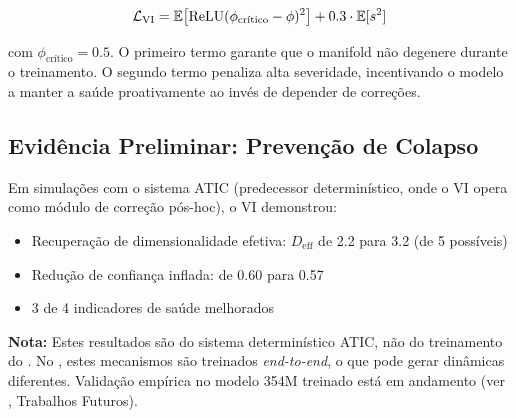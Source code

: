 \begin{equation}
    \mathcal{L}_{\text{VI}} = \mathbb{E}\big[\text{ReLU}(\phi_{\text{cr\'itico}} - \phi)^2\big]
    + 0.3 \cdot \mathbb{E}[s^2]
\end{equation}

com $\phi_{\text{cr\'itico}} = 0.5$. O primeiro termo garante que o manifold
n\~ao degenere durante o treinamento. O segundo termo penaliza alta
severidade, incentivando o modelo a manter a sa\'ude proativamente ao
inv\'es de depender de corre\c{c}\~oes.

\subsection{Evid\^encia Preliminar: Preven\c{c}\~ao de Colapso}

Em simula\c{c}\~oes com o sistema ATIC (predecessor determin\'istico, onde
o VI opera como m\'odulo de corre\c{c}\~ao p\'os-hoc), o VI demonstrou:

\begin{itemize}
    \item Recupera\c{c}\~ao de dimensionalidade efetiva: $D_{\text{eff}}$
    de 2.2 para 3.2 (de 5 poss\'iveis)
    \item Redu\c{c}\~ao de confian\c{c}a inflada: de 0.60 para 0.57
    \item 3 de 4 indicadores de sa\'ude melhorados
\end{itemize}

\textbf{Nota:} Estes resultados s\~ao do sistema determin\'istico ATIC,
n\~ao do treinamento do \aletheion{}. No \aletheion{}, estes mecanismos
s\~ao treinados \textit{end-to-end}, o que pode gerar din\^amicas
diferentes. Valida\c{c}\~ao emp\'irica no modelo 354M treinado est\'a em
andamento (ver , Trabalhos Futuros).
